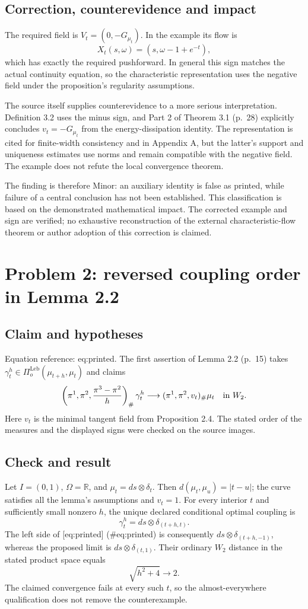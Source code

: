 \documentclass[10pt]{article}
\begin{document}
\subsection*{Correction, counterevidence and impact}
The required field is \(V_t=(0,-G_{\mu_t})\). In the example its flow is \[X_t(s,\omega)=(s,\omega-1+e^{-t}),\] which has exactly the required pushforward. In general this sign matches the actual continuity equation, so the characteristic representation uses the negative field under the proposition’s regularity assumptions.\par
The source itself supplies counterevidence to a more serious interpretation. Definition 3.2 uses the minus sign, and Part 2 of Theorem 3.1 (p. 28) explicitly concludes \(v_t=-G_{\mu_t}\) from the energy-dissipation identity. The representation is cited for finite-width consistency and in Appendix A, but the latter’s support and uniqueness estimates use norms and remain compatible with the negative field. The example does not refute the local convergence theorem.\par
The finding is therefore Minor: an auxiliary identity is false as printed, while failure of a central conclusion has not been established. This classification is based on the demonstrated mathematical impact. The corrected example and sign are verified; no exhaustive reconstruction of the external characteristic-flow theorem or author adoption of this correction is claimed.\par
\section*{Problem 2: reversed coupling order in Lemma 2.2}
\subsection*{Claim and hypotheses}
Equation reference: eq:printed. The first assertion of Lemma 2.2 (p. 15) takes \(\gamma_t^h\in\Pi_o^{\mathrm{Leb}}(\mu_{t+h},\mu_t)\) and claims \[
 \left(\pi^1,\pi^2,\frac{\pi^3-\pi^2}{h}\right)_\#\gamma_t^h
 \longrightarrow (\pi^1,\pi^2,v_t)_\#\mu_t
 \quad\hbox{in }W_2 .\] Here \(v_t\) is the minimal tangent field from Proposition 2.4. The stated order of the measures and the displayed signs were checked on the source images.\par
\subsection*{Check and result}
Let \(I=(0,1)\), \(\Omega=\mathbb R\), and \(\mu_t=ds\otimes\delta_t\). Then \(d(\mu_t,\mu_u)=|t-u|\); the curve satisfies all the lemma’s assumptions and \(v_t=1\). For every interior \(t\) and sufficiently small nonzero \(h\), the unique declared conditional optimal coupling is \[\gamma_t^h=ds\otimes\delta_{(t+h,t)}.\] The left side of [eq:printed] (\#eq:printed) is consequently \(ds\otimes\delta_{(t+h,-1)}\), whereas the proposed limit is \(ds\otimes\delta_{(t,1)}\). Their ordinary \(W_2\) distance in the stated product space equals \[\sqrt{h^2+4}\longrightarrow 2.\] The claimed convergence fails at every such \(t\), so the almost-everywhere qualification does not remove the counterexample.\par
\end{document}
